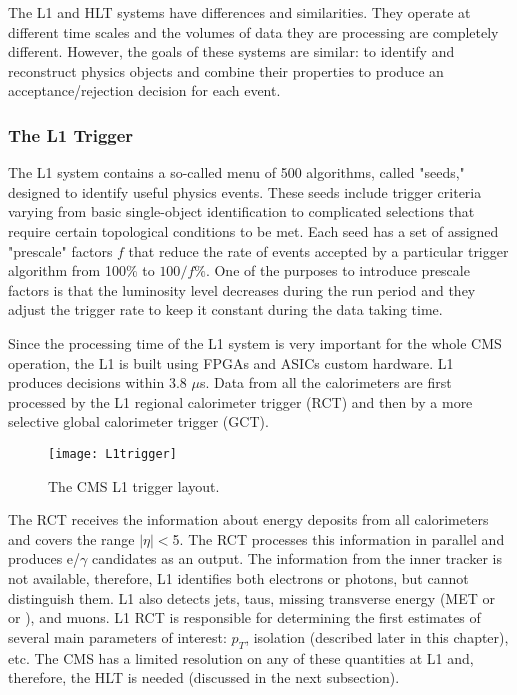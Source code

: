 \begin{normalsize}
The L1 and HLT systems have differences and similarities. They operate at different time scales and the volumes of data they are processing are completely different. However, the goals of these systems are similar: to identify and reconstruct physics objects and combine their properties to produce an acceptance/rejection decision for each event. 


\subsubsection{The L1 Trigger}


The L1 system \cite{CMS_TDR} contains a so-called menu of 500 algorithms, called "seeds," designed to identify useful physics events. These seeds include trigger criteria varying from basic single-object identification to complicated selections that require certain topological conditions to be met. Each seed has a set of assigned "prescale" factors $f$ that reduce the rate of events accepted by a particular trigger algorithm from 100$\%$ to $100/f\%$. One of the purposes to introduce prescale factors is that the luminosity level decreases during the run period and they adjust the trigger rate to keep it constant during the data taking time. 

Since the processing time of the L1 system is very important for the whole CMS operation, the L1 is built using FPGAs and ASICs custom hardware. L1 produces decisions within 3.8 $\mu$s. Data from all the calorimeters are first processed by the L1 regional calorimeter trigger (RCT) and then by a more selective global calorimeter trigger (GCT). 


 \begin{figure}[H]
  \centering
  \texttt{[image: L1trigger]}
  \caption[The CMS L1 trigger layout]{The CMS L1 trigger layout.}
  \label{L1trigger}
\end{figure}

The RCT receives the information about energy deposits from all calorimeters and covers the range $|\eta|<$5. The RCT processes this information in parallel and produces e/$\gamma$ candidates as an output. The information from the inner tracker is not available, therefore, L1 identifies both electrons or photons, but cannot distinguish them. L1 also detects jets, taus, missing transverse energy (MET or \ETslash or \PTslash), and muons. L1 RCT is responsible for determining the first estimates of several main parameters of interest: $p_T$, isolation (described later in this chapter), etc. The CMS has a limited resolution on any of these quantities at L1 and, therefore, the HLT is needed (discussed in the next subsection).


\end{normalsize}
